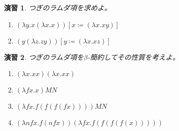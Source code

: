 \documentclass[fleqn]{jsarticle}
\newtheorem{exer}{演習}
\begin{document}
\begin{exer}
つぎのラムダ項を求めよ。

\begin{enumerate}
  \item $( \lambda y.x (\lambda x.x ))[x \coloneqq ( \lambda x.xy)]$
  \item $(y ( \lambda z.zy))[y \coloneqq ( \lambda x.xz)]$
\end{enumerate}
\end{exer}

\begin{exer}
つぎのラムダ項を$\beta$-簡約してその性質を考えよ。

\begin{enumerate}
  \item $( \lambda x.xx)( \lambda x.xx)$
  \item $( \lambda fx.x)MN$
  \item $( \lambda fx.f(f(f(fx))))MN$
  \item $( \lambda nfx. f(nfx))( \lambda fx.f(f(f(f(x)))))$
\end{enumerate}

\end{exer}
\end{document}
